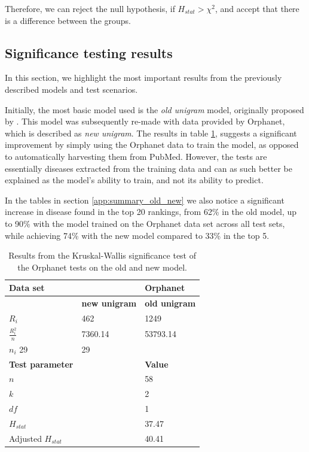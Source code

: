\documentclass[10pt,letterpaper,final]{article}
\begin{document}
Therefore, we can reject the null hypothesis, if $H_{stat} > \chi^2$,
and accept that there is a difference between the groups.



\subsection{Significance testing results}
In this section, we highlight the most important results from the
previously described models and test scenarios.

Initially, the most basic model used is the \textit{old unigram} model,
originally proposed by \cite{jensenandersen}. This model was
subsequently re-made with data provided by Orphanet, which is described
as \textit{new unigram}. The results in table \ref{tab:orpha_old_new_stat},
suggests a significant improvement by simply using the Orphanet data to
train the model, as opposed to automatically harvesting them from
PubMed. However, the tests are essentially diseases extracted from the
training data and can as such better be explained as the model's ability
to train, and not its ability to predict.

In the tables in section \ref{app:summary_old_new} we also notice a
significant increase in disease found in the top 20 rankings, from 62\%
in the old model, up to 90\% with the model trained on the Orphanet data
set across all test sets, while achieving 74\% with the new model
compared to 33\% in the top 5.

\begin{table}[here]
\begin{center}
\begin{tabular}{lll}
    \textbf{Data set} & & \textbf{Orphanet} \\ \hline\hline
 &	\textbf{new unigram} &	\textbf{old unigram} \\ \hline
$R_{i}$ &	462 &	1249 \\
$\frac{R_{i}^2}{n}$ &	7360.14	& 53793.14 \\
$n_{i}$	29	& 29 \\ \hline \hline
\textbf{Test parameter}	&	&\textbf{Value} \\ \hline
$n$	 &  &  58 \\
$k$  &  &  2 \\
$df$ &  &  1 \\ \hline \hline
$H_{stat}$  &  &  37.47 \\
Adjusted $H_{stat}$ & &  40.41 \\
\end{tabular}
    \caption{Results from the Kruskal-Wallis significance test of the Orphanet tests on the old and new model.}
    \label{tab:orpha_old_new_stat}
\end{center}
\end{table}
\end{document}
